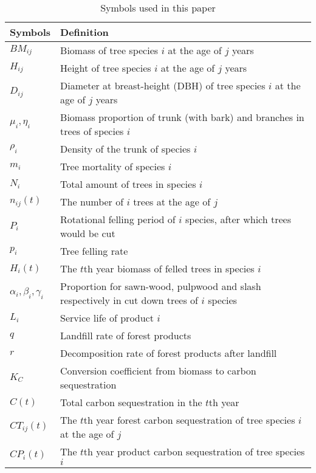 \begin{table}[ht] %
\centering
\caption{Symbols used in this paper}
\begin{tabular}{ll}
\hline
\textbf{Symbols} & \textbf{Definition}                                          \\ 
\hline
    $BM_{ij}$   & Biomass of tree species $i$ at the age of $j$ years \\
    $H_{ij}$    & Height of tree species $i$ at the age of $j$ years \\
    $D_{ij}$    & Diameter at breast-height (DBH) of tree species $i$ at the age of $j$ years \\
    $\mu_{i}, \eta_{i}$   & Biomass proportion of trunk (with bark) and branches in trees of species $i$ \\
    $\rho_{i}$  & Density of the trunk of species $i$ \\
    $m_{i}$     & Tree mortality of species $i$ \\
    $N_{i}$     & Total amount of trees in species $i$ \\
    $n_{ij}(t)$ & The number of $i$ trees at the age of $j$ \\
\hline
    $P_{i}$     & Rotational felling period of $i$ species, after which trees would be cut \\
    $p_{i}$     & Tree felling rate \\
    $H_i(t)$    & The $t$th year biomass of felled trees in species $i$ \\
    $\alpha_i,\beta_i,\gamma_i$  & \makecell[l]{Proportion for sawn-wood, pulpwood and slash respectively in cut\\ down trees of $i$ species} \\
    $L_i$       & Service life of product $i$ \\
    $q$         & Landfill rate of forest products \\
    $r$         & Decomposition rate of forest products after landfill \\
\hline
    $K_{C}$     & Conversion coefficient from biomass to carbon sequestration \\
    $C(t)$      & Total carbon sequestration in the $t$th year\\
    $CT_{ij}(t)$& The $t$th year forest carbon sequestration of tree species $i$ at the age of $j$ \\
    $CP_{i}(t)$& The $t$th year product carbon sequestration of tree species $i$ \\

\end{tabular}
\end{table}
